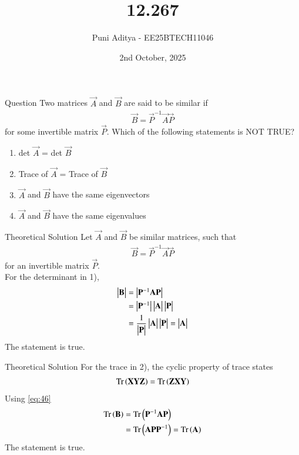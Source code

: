 \documentclass{beamer}
\title{12.267}
\date{2nd October, 2025}
\author{Puni Aditya - EE25BTECH11046}
\begin{document}
\frame{\titlepage}
\begin{frame}{Question}
Two matrices $\vec{A}$ and $\vec{B}$ are said to be similar if 
\begin{align*}
    \vec{B} = \vec{P}^{-1} \vec{A}\vec{P}
\end{align*}
for some invertible matrix $\vec{P}$. Which of the following statements is NOT TRUE?
\begin{enumerate}
    \item det $\vec{A}$ = det $\vec{B}$
    \item Trace of $\vec{A}$ = Trace of $\vec{B}$
    \item $\vec{A}$ and $\vec{B}$ have the same eigenvectors
    \item $\vec{A}$ and $\vec{B}$ have the same eigenvalues
\end{enumerate}
\end{frame}

\begin{frame}{Theoretical Solution}
Let $\vec{A}$ and $\vec{B}$ be similar matrices, such that 
\begin{align} 
    \vec{B} = \vec{P}^{-1}\vec{A}\vec{P}
\end{align}
for an invertible matrix $\vec{P}$. \\
For the determinant in 1),
\begin{align}
    \begin{vmatrix}\mathbf{B}\end{vmatrix} &= \begin{vmatrix}\mathbf{P}^{-1}\mathbf{A}\mathbf{P}\end{vmatrix} \\
    &= \begin{vmatrix}\mathbf{P}^{-1}\end{vmatrix}\begin{vmatrix}\mathbf{A}\end{vmatrix}\begin{vmatrix}\mathbf{P}\end{vmatrix} \\
    &= \frac{1}{\begin{vmatrix}\mathbf{P}\end{vmatrix}}\begin{vmatrix}\mathbf{A}\end{vmatrix}\begin{vmatrix}\mathbf{P}\end{vmatrix} = \begin{vmatrix}\mathbf{A}\end{vmatrix}
\end{align}
The statement is true.
\end{frame}

\begin{frame}{Theoretical Solution}
For the trace in 2), the cyclic property of trace states 
\begin{align}
    \text{Tr}\left(\mathbf{X}\mathbf{Y}\mathbf{Z}\right) = \text{Tr}\left(\mathbf{Z}\mathbf{X}\mathbf{Y}\right) \label{eq:46}
\end{align}
Using \eqref{eq:46}
\begin{align}
    \text{Tr}\left(\mathbf{B}\right) &= \text{Tr}\left(\mathbf{P}^{-1}\mathbf{A}\mathbf{P}\right) \\
    &= \text{Tr}\left(\mathbf{A}\mathbf{P}\mathbf{P}^{-1}\right) = \text{Tr}\left(\mathbf{A}\right)
\end{align}
The statement is true.
\end{frame}
\end{document}
